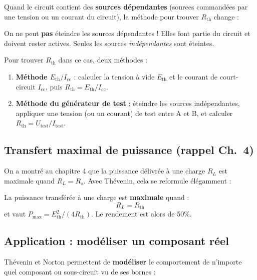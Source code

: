 \documentclass[12pt,a4paper,twoside]{book}
\begin{document}
Quand le circuit contient des \textbf{sources dépendantes} (sources commandées par une tension ou un courant du circuit), la méthode pour trouver $R_{\text{th}}$ change :

\begin{attention}
On ne peut \textbf{pas} éteindre les sources dépendantes ! Elles font partie du circuit et doivent rester actives. Seules les sources \textit{indépendantes} sont éteintes.

Pour trouver $R_{\text{th}}$ dans ce cas, deux méthodes :
\begin{enumerate}[nosep]
\item \textbf{Méthode $E_{\text{th}}/I_{\text{cc}}$} : calculer la tension à vide $E_{\text{th}}$ et le courant de court-circuit $I_{\text{cc}}$, puis $R_{\text{th}} = E_{\text{th}}/I_{\text{cc}}$.
\item \textbf{Méthode du générateur de test} : éteindre les sources indépendantes, appliquer une tension (ou un courant) de test entre A et B, et calculer $R_{\text{th}} = U_{\text{test}}/I_{\text{test}}$.
\end{enumerate}
\end{attention}

\subsection{Transfert maximal de puissance (rappel Ch.\ 4)}

On a montré au chapitre 4 que la puissance délivrée à une charge $R_L$ est maximale quand $R_L = R_s$. Avec Thévenin, cela se reformule élégamment :

\begin{formule}
La puissance transférée à une charge est \textbf{maximale} quand :
\[
\boxed{R_L = R_{\text{th}}}
\]
et vaut $P_{\max} = E_{\text{th}}^2 / (4R_{\text{th}})$. Le rendement est alors de 50\%.
\end{formule}

\subsection{Application : modéliser un composant réel}

Thévenin et Norton permettent de \textbf{modéliser} le comportement de n'importe quel composant ou sous-circuit vu de ses bornes :
\end{document}

